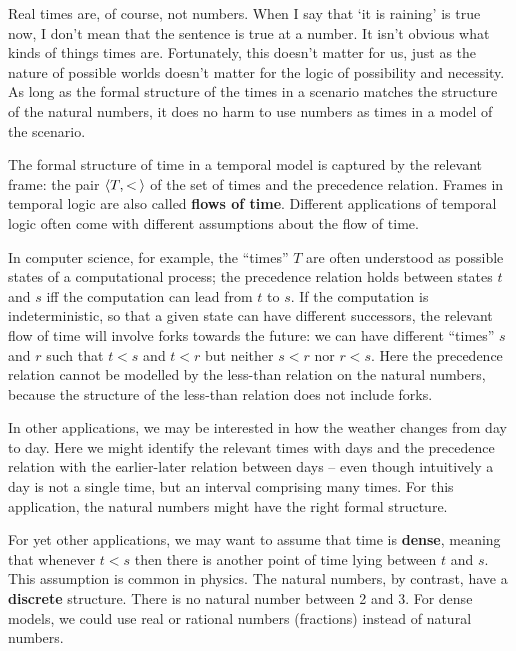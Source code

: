 Real times are, of course, not numbers. When I say that `it is raining' is true
now, I don't mean that the sentence is true at a number. It isn't
obvious what kinds of things times are. Fortunately, this doesn't matter for us,
just as the nature of possible worlds doesn't matter for the logic of
possibility and necessity. As long as the formal structure of the times in a
scenario matches the structure of the natural numbers, it does no harm to use
numbers as times in a model of the scenario.

The formal structure of time in a temporal model is captured by the relevant
frame: the pair $\t{T,<\!}$ of the set of times and the precedence relation.
Frames in temporal logic are also called \textbf{flows of time}. Different
applications of temporal logic often come with different assumptions about the
flow of time.

In computer science, for example, the ``times'' $T$ are often understood as
possible states of a computational process; the precedence relation holds
between states $t$ and $s$ iff the computation can lead from $t$ to $s$. If
the computation is indeterministic, so that a given state can have different
successors, the relevant flow of time will involve forks towards the future: we
can have different ``times'' $s$ and $r$ such that $t<s$ and $t<r$ but neither
$s<r$ nor $r<s$. Here the precedence relation cannot be modelled by the
less-than relation on the natural numbers, because the structure of the
less-than relation does not include forks.

In other applications, we may be interested in how the weather changes from day
to day. Here we might identify the relevant times with days and the precedence
relation with the earlier-later relation between days -- even though intuitively a day
is not a single time, but an interval comprising many times. For this
application, the natural numbers might have the right formal structure.

For yet other applications, we may want to assume that time is \textbf{dense},
meaning that whenever $t < s$ then there is another point of time lying 
between $t$ and $s$. This assumption is common in physics. The natural numbers,
by contrast, have a \textbf{discrete} structure. There is no natural number
between 2 and 3. For dense models, we could use real or rational numbers
(fractions) instead of natural numbers.


